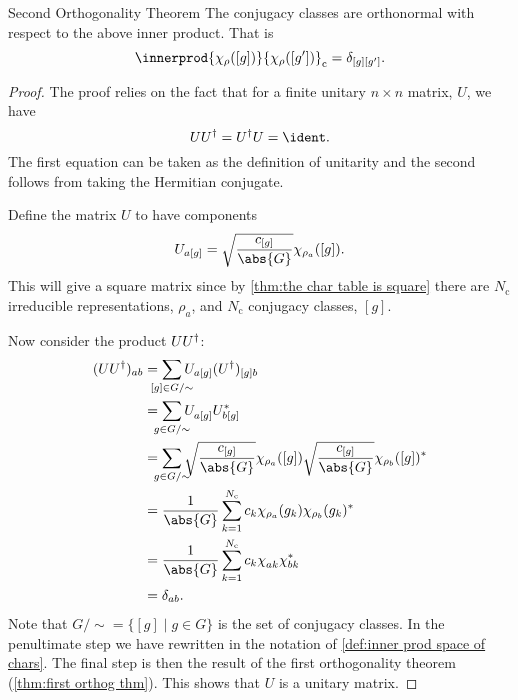 \begin{thm}{Second Orthogonality Theorem}{}
    The conjugacy classes are orthonormal with respect to the above inner
    product.
    That is
    \begin{equation}
        \innerprod{\chi_\rho([g])}{\chi_\rho([g'])}_{\mathrm{c}} =
        \delta_{[g][g']}.
    \end{equation}
    \begin{proof}
        The proof relies on the fact that for a finite unitary \(n \times
        n\) matrix, \(U\), we have
        \begin{equation}
            UU^\hermit = U^\hermit U = \ident.
        \end{equation}
        The first equation can be taken as the definition of unitarity and
        the second follows from taking the Hermitian conjugate.
        
        Define the matrix \(U\) to have components
        \begin{equation}
            U_{a[g]} = \sqrt{\frac{c_{[g]}}{\abs{G}}} \chi_{\rho_a}([g]).
        \end{equation}
        This will give a square matrix since by \cref{thm:the char table is
            square} there are \(N_{\mathrm{c}}\) irreducible representations, \(\rho_a\),
        and \(N_{\mathrm{c}}\) conjugacy classes, \([g]\).
        
        Now consider the product \(UU^\dagger\):
        \begin{align}
            (UU^\hermit)_{ab} &= \sum_{\mathclap{[g] \in G/\sim}}
            U_{a[g]}(U^{\hermit})_{[g]b}\\
            &= \sum_{\mathclap{g \in G/\sim}}
            U_{a[g]}^{\phantom{*}}U_{b[g]}^{*}\\
            &= \sum_{\mathclap{g \in G/\sim}} \sqrt{\frac{c_{[g]}}{\abs{G}}}
            \chi_{\rho_a}([g]) \sqrt{\frac{c_{[g]}}{\abs{G}}} \chi_{\rho_{b}}([g])^*\\
            &= \frac{1}{\abs{G}} \sum_{k = 1}^{N_{\mathrm{c}}} c_{k}
            \chi_{\rho_a}(g_k)\chi_{\rho_b}(g_k)^*\\
            &= \frac{1}{\abs{G}} \sum_{k = 1}^{N_{\mathrm{c}}} c_k
            \chi_{ak}^{\phantom{*}}\chi_{bk}^{*}\\
            &= \delta_{ab}.
        \end{align}
        Note that \(G/{\sim} = \{[g] \mid g \in G\}\) is the set of
        conjugacy classes.
        In the penultimate step we have rewritten in the notation of
        \cref{def:inner prod space of chars}.
        The final step is then the result of the first orthogonality theorem
        (\cref{thm:first orthog thm}).
        This shows that \(U\) is a unitary matrix.
        

\end{proof}
\end{thm}
